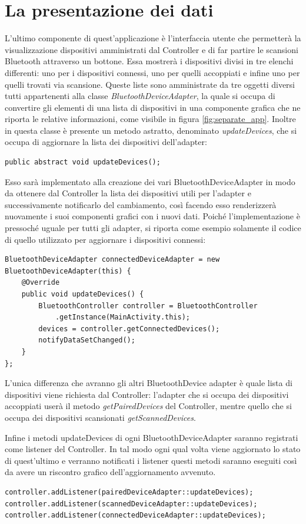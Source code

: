 \section{La presentazione dei dati}
L'ultimo componente di quest'applicazione è l'interfaccia utente che permetterà la visualizzazione dispositivi amministrati dal Controller e di far partire le scansioni Bluetooth attraverso un bottone. Essa mostrerà i dispositivi divisi in tre elenchi differenti: uno per i dispositivi connessi, uno per quelli accoppiati e infine uno per quelli trovati via scansione. Queste liste sono amministrate da tre oggetti diversi tutti appartenenti alla classe \textit{BluetoothDeviceAdapter}, la quale si occupa di convertire gli elementi di una lista di dispositivi in una componente grafica che ne riporta le relative informazioni, come visibile in figura \ref{fig:separate_app}.
Inoltre in questa classe è presente un metodo astratto, denominato \textit{updateDevices}, che si occupa di aggiornare la lista dei dispositivi dell'adapter:
\begin{verbatim}
public abstract void updateDevices();
\end{verbatim}
Esso sarà implementato alla creazione dei vari BluetoothDeviceAdapter in modo da ottenere dal Controller la lista dei dispositivi utili per l'adapter e successivamente notificarlo del cambiamento, così facendo esso renderizzerà nuovamente i suoi componenti grafici con i nuovi dati. Poiché l'implementazione è pressoché uguale per tutti gli adapter, si riporta come esempio solamente il codice di quello utilizzato per aggiornare i dispositivi connessi:
\begin{verbatim}
BluetoothDeviceAdapter connectedDeviceAdapter = new BluetoothDeviceAdapter(this) {
    @Override
    public void updateDevices() {
        BluetoothController controller = BluetoothController
            .getInstance(MainActivity.this);
        devices = controller.getConnectedDevices();
        notifyDataSetChanged();
    }
};
\end{verbatim}
L'unica differenza che avranno gli altri BluetoothDevice adapter è quale lista di dispositivi viene richiesta dal Controller: l'adapter che si occupa dei dispositivi accoppiati userà il metodo \textit{getPairedDevices} del Controller, mentre quello che si occupa dei dispositivi scansionati \textit{getScannedDevices}.

Infine i metodi updateDevices di ogni BluetoothDeviceAdapter saranno registrati come listener del Controller. In tal modo ogni qual volta viene aggiornato lo stato di quest'ultimo e verranno notificati i listener questi metodi saranno eseguiti così da avere un riscontro grafico dell'aggiornamento avvenuto.
\begin{verbatim}
controller.addListener(pairedDeviceAdapter::updateDevices);
controller.addListener(scannedDeviceAdapter::updateDevices);
controller.addListener(connectedDeviceAdapter::updateDevices);
\end{verbatim}

